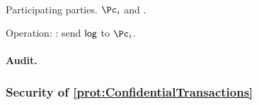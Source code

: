 \begin{protocol}~\label{prot:ConfidentialTransactions:History}
	\item[Participating parties.] $\Pc_i$ and \Cc.
		
	\item Operation: \Cc: send  $\mathsf{log}$ to $\Pc_i$.
	
\end{protocol}


\paragraph{Audit.} 


\subsubsection{Security of \cref{prot:ConfidentialTransactions}}
\begin{theorem}\label{thm:ConfidentialTransactions}
\end{theorem}


